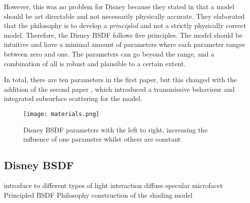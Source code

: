 However, this was no problem for Disney because they stated in \cite{burley_physically_2012} that a model should be art directable and not necessarily physically accurate.
They elaborated that the philosophy is to develop a \textit{principled} and not a strictly physically correct model.
Therefore, the Disney BSDF follows five principles.
The model should be intuitive and have a minimal amount of parameters where each parameter ranges between zero and one.
The parameters can go beyond the range, and a combination of all is robust and plausible to a certain extent.

In total, there are ten parameters in the first paper, but this changed with the addition of the second paper \cite{burley_extending_2015}, which introduced a transmissive behaviour and integrated subsurface scattering for the model.

\begin{figure}[h]
\centering
\texttt{[image: materials.png]}
\caption[]{Disney BSDF parameters with the left to right, increasing the influence of one parameter whilst others are constant}
\label{fig:materials}
\end{figure}

\subsection{Disney BSDF}

\cite{burley_physically_2012}



introduce to different types of light interaction
diffuse
specular
microfacet
Principled BSDF
Philosophy
construction of the shading model

